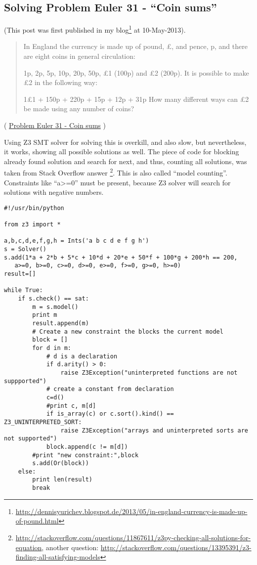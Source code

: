 \subsection{Solving Problem Euler 31 - ``Coin sums''}

(This post was first published in my blog\footnote{\url{http://dennisyurichev.blogspot.de/2013/05/in-england-currency-is-made-up-of-pound.html}} at 10-May-2013).

\begin{framed}
\begin{quotation}
In England the currency is made up of pound, £, and pence, p, and there are eight coins in general circulation:

1p, 2p, 5p, 10p, 20p, 50p, £1 (100p) and £2 (200p).
It is possible to make £2 in the following way:

1£1 + 150p + 220p + 15p + 12p + 31p
How many different ways can £2 be made using any number of coins?
\end{quotation}
\end{framed}
( \href{http://projecteuler.net/problem=31}{Problem Euler 31 - Coin sums} )

\label{SMTEnumerate}
Using Z3 \ac{SMT} solver for solving this is overkill, and also slow, but nevertheless, it works, showing all possible solutions as well.
The piece of code for blocking already found solution and search for next, and thus, counting all solutions, was taken from Stack Overflow answer
\footnote{\url{http://stackoverflow.com/questions/11867611/z3py-checking-all-solutions-for-equation}, 
another question: \url{http://stackoverflow.com/questions/13395391/z3-finding-all-satisfying-models}}.
This is also called ``model counting''.
Constraints like ``a>=0'' must be present, because Z3 solver will search for solutions with negative numbers.

\begin{lstlisting}
#!/usr/bin/python

from z3 import *

a,b,c,d,e,f,g,h = Ints('a b c d e f g h')
s = Solver()
s.add(1*a + 2*b + 5*c + 10*d + 20*e + 50*f + 100*g + 200*h == 200, 
   a>=0, b>=0, c>=0, d>=0, e>=0, f>=0, g>=0, h>=0)
result=[]

while True:
    if s.check() == sat:
        m = s.model()
        print m
        result.append(m)
        # Create a new constraint the blocks the current model
        block = []
        for d in m:
            # d is a declaration
            if d.arity() > 0:
                raise Z3Exception("uninterpreted functions are not suppported")
            # create a constant from declaration
            c=d()
            #print c, m[d]
            if is_array(c) or c.sort().kind() == Z3_UNINTERPRETED_SORT:
                raise Z3Exception("arrays and uninterpreted sorts are not supported")
            block.append(c != m[d])
        #print "new constraint:",block
        s.add(Or(block))
    else:
        print len(result)
        break
\end{lstlisting}

